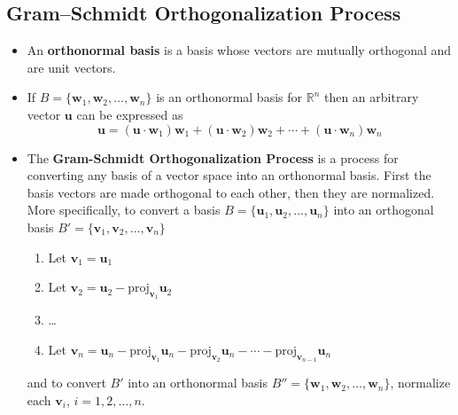 \documentclass{article}
\begin{document}
\subsection{Gram–Schmidt Orthogonalization Process}

\begin{itemize}
  \item An \textbf{orthonormal basis} is a basis whose vectors are mutually orthogonal and are unit vectors.

  \item If $B = \{\mathbf{w}_1, \mathbf{w}_2, \ldots, \mathbf{w}_n\}$ is an orthonormal basis for $\mathbb{R}^n$ then an arbitrary vector $\mathbf{u}$ can be expressed as \[\mathbf{u} = (\mathbf{u} \cdot \mathbf{w}_1) \mathbf{w}_1 + (\mathbf{u} \cdot \mathbf{w}_2) \mathbf{w}_2 + \cdots + (\mathbf{u} \cdot \mathbf{w}_n) \mathbf{w}_n\]

  \item The \textbf{Gram-Schmidt Orthogonalization Process} is a process for converting any basis of a vector space into an orthonormal basis. First the basis vectors are made orthogonal to each other, then they are normalized. More specifically, to convert a basis $B = \{\mathbf{u}_1, \mathbf{u}_2, \ldots, \mathbf{u}_n\}$ into an orthogonal basis $B' = \{\mathbf{v}_1, \mathbf{v}_2, \ldots, \mathbf{v}_n\}$

        \begin{enumerate}
          \item Let $\mathbf{v}_1 = \mathbf{u}_1$

          \item Let $\mathbf{v}_2 = \mathbf{u}_2 - \text{proj}_{\mathbf{v}_1} \mathbf{u}_2$

          \item \ldots

          \item Let $\mathbf{v}_n = \mathbf{u}_n - \text{proj}_{\mathbf{v}_1} \mathbf{u}_n - \text{proj}_{\mathbf{v}_2} \mathbf{u}_n - \cdots - \text{proj}_{\mathbf{v}_{n - 1}} \mathbf{u}_n$
        \end{enumerate}

        and to convert $B'$ into an orthonormal basis $B'' = \{\mathbf{w}_1, \mathbf{w}_2, \ldots, \mathbf{w}_n\}$, normalize each $\mathbf{v}_i$, $i = 1, 2, \ldots, n$.
\end{itemize}
\end{document}
